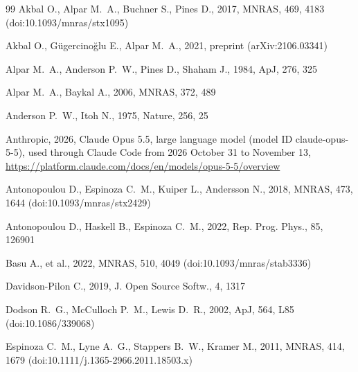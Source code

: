 \documentclass[fleqn,usenatbib]{mnras}
\newcommand{\mnrasref}[2]{MNRAS, #1, #2}
\begin{document}

\begin{thebibliography}{99}
Akbal O., Alpar M.~A., Buchner S., Pines D., 2017, \mnrasref{469}{4183}
(doi:10.1093/mnras/stx1095)

Akbal O., G\"ugercino\u{g}lu E., Alpar M.~A., 2021, preprint
(arXiv:2106.03341)

Alpar M.~A., Anderson P.~W., Pines D., Shaham J., 1984, ApJ, 276, 325

Alpar M.~A., Baykal A., 2006, \mnrasref{372}{489}

Anderson P.~W., Itoh N., 1975, Nature, 256, 25

Anthropic, 2026, Claude Opus 5.5, large language model (model ID
claude-opus-5-5), used through Claude Code from 2026 October 31 to
November 13, \url{https://platform.claude.com/docs/en/models/opus-5-5/overview}

Antonopoulou D., Espinoza C.~M., Kuiper L., Andersson N., 2018,
\mnrasref{473}{1644} (doi:10.1093/mnras/stx2429)

Antonopoulou D., Haskell B., Espinoza C.~M., 2022, Rep. Prog. Phys., 85,
126901

Basu A., et al., 2022, \mnrasref{510}{4049} (doi:10.1093/mnras/stab3336)

Davidson-Pilon C., 2019, J. Open Source Softw., 4, 1317

Dodson R.~G., McCulloch P.~M., Lewis D.~R., 2002, ApJ, 564, L85
(doi:10.1086/339068)

Espinoza C.~M., Lyne A.~G., Stappers B.~W., Kramer M., 2011,
\mnrasref{414}{1679} (doi:10.1111/j.1365-2966.2011.18503.x)


\end{thebibliography}
\end{document}
